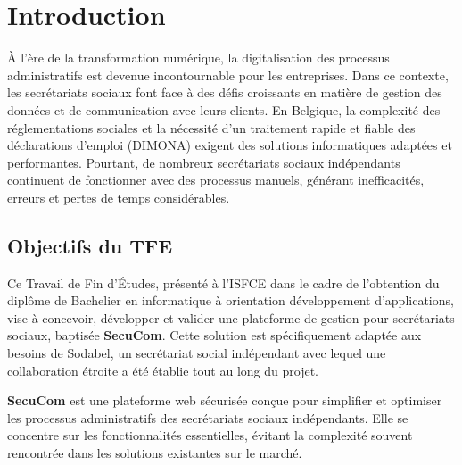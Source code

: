 \chapter{Introduction}

À l'ère de la transformation numérique, la digitalisation des processus administratifs est devenue incontournable pour les entreprises. Dans ce contexte, les secrétariats sociaux font face à des défis croissants en matière de gestion des données et de communication avec leurs clients. En Belgique, la complexité des réglementations sociales et la nécessité d'un traitement rapide et fiable des déclarations d'emploi (DIMONA) exigent des solutions informatiques adaptées et performantes. Pourtant, de nombreux secrétariats sociaux indépendants continuent de fonctionner avec des processus manuels, générant inefficacités, erreurs et pertes de temps considérables.

\section{Objectifs du TFE}

Ce Travail de Fin d'Études, présenté à l'ISFCE dans le cadre de l'obtention du diplôme de Bachelier en informatique à orientation développement d'applications, vise à concevoir, développer et valider une plateforme de gestion pour secrétariats sociaux, baptisée \textbf{SecuCom}. Cette solution est spécifiquement adaptée aux besoins de Sodabel, un secrétariat social indépendant avec lequel une collaboration étroite a été établie tout au long du projet.

\vspace{0.5cm}

\begin{tcolorbox}[
  title={\textbf{SecuCom}},
  colback=blue!5!white,
  colframe=primarycolor,
  fonttitle=\bfseries,
  boxrule=0.5mm,
  arc=2mm,
  left=6mm,
  right=6mm,
  top=6mm,
  bottom=6mm
]\textbf{SecuCom} est une plateforme web sécurisée conçue pour simplifier et optimiser les processus administratifs des secrétariats sociaux indépendants. Elle se concentre sur les fonctionnalités essentielles, évitant la complexité souvent rencontrée dans les solutions existantes sur le marché.
\end{tcolorbox}

\vspace{0.5cm}



